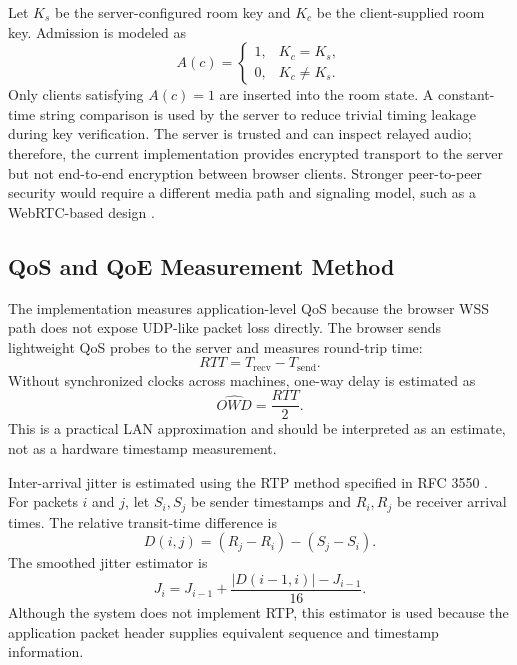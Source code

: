 \documentclass[conference]{IEEEtran}
\begin{document}
Let $K_s$ be the server-configured room key and $K_c$ be the client-supplied room key. Admission is modeled as
\begin{equation}
    A(c)=
    \begin{cases}
        1, & K_c=K_s,\\
        0, & K_c\neq K_s.
    \end{cases}
    \label{eq:admission}
\end{equation}
Only clients satisfying $A(c)=1$ are inserted into the room state. A constant-time string comparison is used by the server to reduce trivial timing leakage during key verification. The server is trusted and can inspect relayed audio; therefore, the current implementation provides encrypted transport to the server but not end-to-end encryption between browser clients. Stronger peer-to-peer security would require a different media path and signaling model, such as a WebRTC-based design \cite{ieee_webrtc_signaling_security}.

\subsection{QoS and QoE Measurement Method}

The implementation measures application-level QoS because the browser WSS path does not expose UDP-like packet loss directly. The browser sends lightweight QoS probes to the server and measures round-trip time:
\begin{equation}
    RTT = T_{\mathrm{recv}} - T_{\mathrm{send}}.
    \label{eq:rtt}
\end{equation}
Without synchronized clocks across machines, one-way delay is estimated as
\begin{equation}
    \widehat{OWD} = \frac{RTT}{2}.
    \label{eq:owd}
\end{equation}
This is a practical LAN approximation and should be interpreted as an estimate, not as a hardware timestamp measurement.

Inter-arrival jitter is estimated using the RTP method specified in RFC 3550 \cite{rfc3550}. For packets $i$ and $j$, let $S_i,S_j$ be sender timestamps and $R_i,R_j$ be receiver arrival times. The relative transit-time difference is
\begin{equation}
    D(i,j)=(R_j-R_i)-(S_j-S_i).
    \label{eq:dij}
\end{equation}
The smoothed jitter estimator is
\begin{equation}
    J_i = J_{i-1}+\frac{|D(i-1,i)|-J_{i-1}}{16}.
    \label{eq:jitter}
\end{equation}
Although the system does not implement RTP, this estimator is used because the application packet header supplies equivalent sequence and timestamp information.
\end{document}
